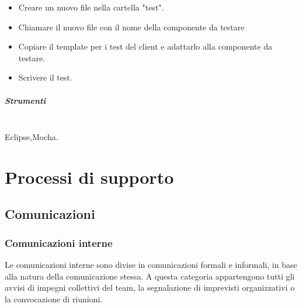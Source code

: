 \begin{itemize}
\item Creare un nuovo file nella cartella "test".
\item Chiamare il nuovo file con il nome della componente da testare
\item Copiare il template per i test del client e adattarlo alla componente da testare.
\item Scrivere il test.
\end{itemize}



\subparagraph{Strumenti} \hfill \\

Eclipse,Mocha.


\section{Processi di supporto}

\subsection{Comunicazioni}
\subsubsection{Comunicazioni interne}
Le comunicazioni interne sono divise in comunicazioni formali e informali, in base alla natura della comunicazione stessa. A questa categoria appartengono tutti gli avvisi di impegni collettivi del team, la segnalazione di
imprevisti organizzativi o la convocazione di riunioni.
